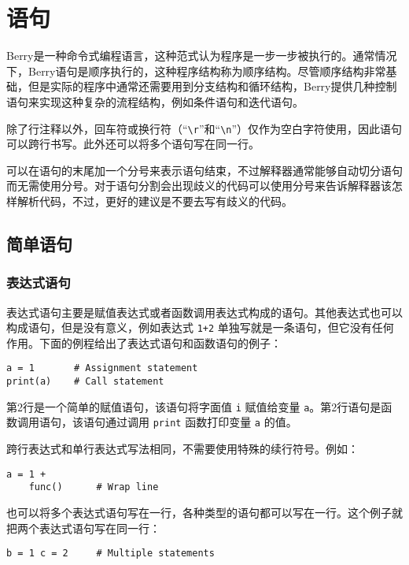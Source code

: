 \chapter{语句}

Berry是一种命令式编程语言，这种范式认为程序是一步一步被执行的。通常情况下，Berry语句是顺序执行的，这种程序结构称为顺序结构。尽管顺序结构非常基础，但是实际的程序中通常还需要用到分支结构和循环结构，Berry提供几种控制语句来实现这种复杂的流程结构，例如条件语句和迭代语句。

除了行注释以外，回车符或换行符（``\texttt{\textbackslash r}''和``\texttt{\textbackslash n}''）仅作为空白字符使用，因此语句可以跨行书写。此外还可以将多个语句写在同一行。

可以在语句的末尾加一个分号来表示语句结束，不过解释器通常能够自动切分语句而无需使用分号。对于语句分割会出现歧义的代码可以使用分号来告诉解释器该怎样解析代码，不过，更好的建议是不要去写有歧义的代码。

\section{简单语句}

\subsection{表达式语句}

表达式语句主要是赋值表达式或者函数调用表达式构成的语句。其他表达式也可以构成语句，但是没有意义，例如表达式 \texttt{1+2} 单独写就是一条语句，但它没有任何作用。下面的例程给出了表达式语句和函数语句的例子：
\begin{lstlisting}[language=berry, numbers=none]
a = 1       # Assignment statement
print(a)    # Call statement
\end{lstlisting}
第2行是一个简单的赋值语句，该语句将字面值 \texttt{i} 赋值给变量 \texttt{a}。第2行语句是函数调用语句，该语句通过调用 \texttt{print} 函数打印变量 \texttt{a} 的值。

跨行表达式和单行表达式写法相同，不需要使用特殊的续行符号。例如：
\begin{lstlisting}[language=berry, numbers=none]
a = 1 +
    func()      # Wrap line
\end{lstlisting}
也可以将多个表达式语句写在一行，各种类型的语句都可以写在一行。这个例子就把两个表达式语句写在同一行：
\begin{lstlisting}[language=berry, numbers=none]
b = 1 c = 2     # Multiple statements
\end{lstlisting}

